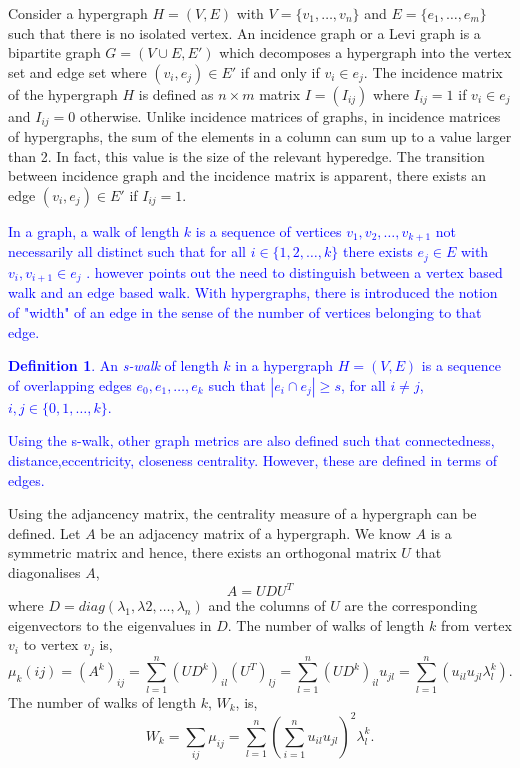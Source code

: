 \documentclass[a4paper,12pt]{article}
\theoremstyle{definition}
\newtheorem{definition}{Definition}%
\theoremstyle{remark}
\begin{document}
Consider a hypergraph $H=(V,E)$ with $V=\{ v_1 , \ldots, v_n \}$ and $E=\{ e_1 , \ldots, e_m \}$ such that there is no isolated vertex. An incidence graph or a Levi graph \cite{Joslyn2017UbergraphsAD} is a bipartite graph $ G = (V \cup E, E') $ which decomposes a hypergraph into the vertex set and edge set where $ (v_i,e_j) \in E'$ if and only if $v_i \in e_j $. The incidence matrix of the hypergraph $ H $ is defined as $n \times m$ matrix $I=(I_{ij} )$ where $I_{ij} =1$ if $v_i \in e_j$ and $I_{ij} =0$ otherwise. Unlike incidence matrices of graphs, in incidence matrices of hypergraphs, the sum of the elements in a column can sum up to a value larger than 2. In fact, this value is the size of the relevant hyperedge. The transition between incidence graph and the incidence matrix is apparent, there exists an edge $ (v_i,e_j) \in E' $ if $ I_{ij} = 1$.

\textcolor{blue}{In a graph, a walk of length $ k $ is a sequence of vertices $ v_1,v_2,\ldots, v_{k+1} $ not necessarily all distinct such that for all $ i \in \{ 1,2,\ldots, k \}$ there exists $e_j \in E $ with $v_i, v_{i+1} \in e_j $ \cite{Estrada_2006}. \cite{Aksoy2020} however points out the need to distinguish between a vertex based walk and an edge based walk. With hypergraphs, there is introduced the notion of "width" of an edge in the sense of the number of vertices belonging to that edge.}

\textcolor{blue}{\begin{definition}
    An \textit{s-walk} of length $ k $ in a hypergraph $ H = (V,E) $ is a sequence of overlapping edges $e_0, e_1, \ldots, e_k$ such that $ |e_i\cap e_j | \ge s$, for all $ i \ne j$, $ i,j \in \{0,1,\ldots, k\} $.
\end{definition}}

\textcolor{blue}{Using the s-walk, other graph metrics are also defined such that connectedness, distance,eccentricity, closeness centrality. However, these are defined in terms of edges.}

Using the adjancency matrix, the centrality measure of a hypergraph can be defined. Let $A$ be an adjacency matrix of a hypergraph. We know $ A $ is a symmetric matrix and hence, there exists an orthogonal matrix $ U $ that diagonalises $ A$,
\[A = UDU^T \]
where $ D = diag(\lambda_1, \lambda2, \ldots, \lambda_n) $ and the columns of $ U $ are the corresponding eigenvectors to the eigenvalues in $D$. The number of walks of length $ k $ from vertex $ v_i $ to vertex $ v_j $ is,
\[ \mu_k (ij) = (A^k)_{ij} = \sum_{l=1}^n(UD^k)_{il}(U^T)_{lj} = \sum_{l=1}^n(UD^k)_{il}u_{jl} = \sum_{l=1}^n(u_{il}u_{jl}\lambda_l^k). \]
The number of walks of length $ k $, $W_k $, is,
\[ W_k = \sum_{ij} \mu_{ij} = \sum_{l=1}^n \left(\sum_{i=1}^n u_{il}u_{jl}\right)^2 \lambda_l^k. \]
\end{document}
